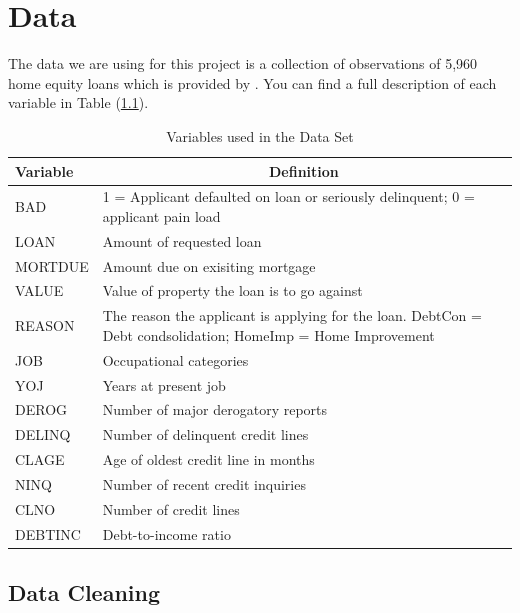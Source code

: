 \chapter{Data} \label{chapter:3}

The data we are using for this project is a collection of observations of 5,960 home equity loans which is provided by \parencite{baesens2016credit}. You can find a full description of each variable in Table (\ref{MetaData}).

\begin{table}[ht]\label{Table2}
	\centering
	\renewcommand{\arraystretch}{1.52}
	\begin{tabular}{l p{10cm}}
	\hline
	Variable & \multicolumn{1}{c}{Definition}\\ 
	\hline
	BAD & 1 = Applicant defaulted on loan or seriously delinquent; 0 = applicant pain load \\
	LOAN & Amount of requested loan \\
	MORTDUE & Amount due on exisiting mortgage \\
	VALUE & Value of property the loan is to go against \\
	REASON & The reason the applicant is applying for the loan. DebtCon = Debt condsolidation; HomeImp = Home Improvement \\
	JOB & Occupational categories \\
	YOJ & Years at present job \\
	DEROG & Number of major derogatory reports \\
	DELINQ & Number of delinquent credit lines \\
	CLAGE & Age of oldest credit line in months \\
	NINQ & Number of recent credit inquiries \\
	CLNO & Number of credit lines \\
	DEBTINC & Debt-to-income ratio \\
	\end{tabular}
	\caption{Variables used in the Data Set \label{MetaData}}
\end{table}

\section{Data Cleaning}

